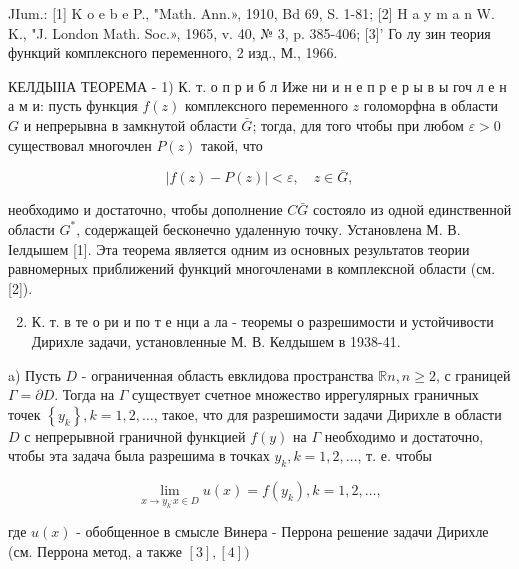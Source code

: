 \documentclass[10pt]{article}
\begin{document}
JIum.: [1] K o e b e P., "Math. Ann.», 1910, Bd 69, S. 1-81; [2] H a y m a n W. K., "J. London Math. Soc.», 1965, v. 40, № 3, p. 385-406; [3]' Го лу зин теория функций комплексного переменного, 2 изд., М., 1966.



КЕЛДЫІІА ТЕОРЕМА - 1) К. т. о п р и б л Иже ни и н е п р е р ы в ы гоч л е н а м и: пусть функция $f(z)$ комплексного переменного $z$ голоморфна в области $G$ и непрерывна в замкнутой области $\bar{G}$; тогда, для того чтобы при любом $\varepsilon>0$ существовал многочлен $P(z)$ такой, что



\[

|f(z)-P(z)|<\varepsilon, \quad z \in \bar{G},

\]



необходимо и достаточно, чтобы дополнение $C \bar{G}$ состояло из одной единственной области $G^{*}$, содержащей бесконечно удаленную точку. Установлена М. В. Іелдышем [1]. Эта теорема является одним из основных результатов теории равномерных приближений функций многочленами в комплексной области (см. [2]).



\begin{enumerate}

  \setcounter{enumi}{1}

  \item К. т. в те о ри и по т е нци а ла - теоремы о разрешимости и устойчивости Дирихле задачи, установленные М. В. Келдышем в 1938-41.

\end{enumerate}



a) Пусть $D$ - ограниченная область евклидова пространства $\mathbb{R} n, n \geqslant 2$, с границей $\Gamma=\partial D$. Тогда на $\Gamma$ существует счетное множество иррегулярных граничных точек $\left\{y_{k}\right\}, k=1,2, \ldots$, такое, что для разрешимости задачи Дирихле в области $D$ с непрерывной граничной функцией $f(y)$ на $\Gamma$ необходимо и достаточно, чтобы эта задача была разрешима в точках $y_{k}, k=1,2, \ldots$, т. е. чтобы



\[

\lim _{x \rightarrow y_{k^{\prime}} x \in D} u(x)=f\left(y_{k}\right), k=1,2, \ldots,

\]



где $u(x)$ - обобщенное в смысле Винера - Перрона решение задачи Дирихле (см. Перрона метод, а также $[3],[4])$
\end{document}

